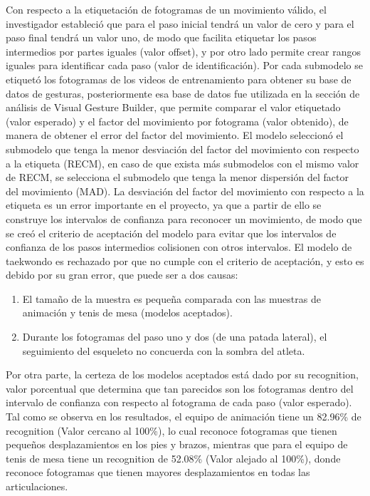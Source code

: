 \medbreak
Con respecto a la etiquetaci\'on de fotogramas de un movimiento v\'alido, el investigador estableci\'o que para el paso inicial tendr\'a un valor de cero y para el paso final tendr\'a un valor uno, de modo que facilita etiquetar los pasos intermedios por partes iguales (valor offset), y por otro lado permite crear rangos iguales para identificar cada paso (valor de identificaci\'on).
\medbreak
Por cada submodelo se etiquet\'o los fotogramas de los videos de entrenamiento para obtener su base de datos de gesturas, posteriormente esa base de datos fue utilizada en la secci\'on de an\'alisis de Visual Gesture Builder, que permite comparar el valor etiquetado (valor esperado) y el factor del movimiento por fotograma (valor obtenido), de manera de obtener el error del factor del movimiento.
\medbreak
El modelo seleccion\'o el submodelo que tenga la menor desviaci\'on del factor del movimiento con respecto a la etiqueta (RECM), en caso de que exista m\'as submodelos con el mismo valor de RECM, se selecciona el submodelo que tenga la menor dispersi\'on del factor del movimiento (MAD).
\medbreak
La desviaci\'on del factor del movimiento con respecto a la etiqueta es un error importante en el proyecto, ya que a partir de ello se construye los intervalos de confianza para reconocer un movimiento, de modo que se cre\'o el criterio de aceptaci\'on del modelo para evitar que los intervalos de confianza de los pasos intermedios colisionen con otros intervalos.
\medbreak
El modelo de taekwondo es rechazado por que no cumple con el criterio de aceptaci\'on, y esto es debido por su gran error, que puede ser a dos causas:
\begin{enumerate}[1.]
\item El tama\~no de la muestra es peque\~na comparada con las muestras de animaci\'on y tenis de mesa (modelos aceptados).
\item Durante los fotogramas del paso uno y dos (de una patada lateral), el seguimiento del esqueleto no concuerda con la sombra del atleta.
\end{enumerate}
Por otra parte, la certeza de los modelos aceptados est\'a dado por su recognition, valor porcentual que determina que tan parecidos son los fotogramas dentro del intervalo de confianza con respecto al fotograma de cada paso (valor esperado). Tal como se observa en los resultados, el equipo de animaci\'on tiene un 82.96\% de recognition (Valor cercano al 100\%), lo cual reconoce fotogramas que tienen peque\~nos desplazamientos en los pies y brazos, mientras que para el equipo de tenis de mesa tiene un recognition de 52.08\%  (Valor alejado al 100\%), donde reconoce fotogramas que tienen mayores desplazamientos en todas las articulaciones.
